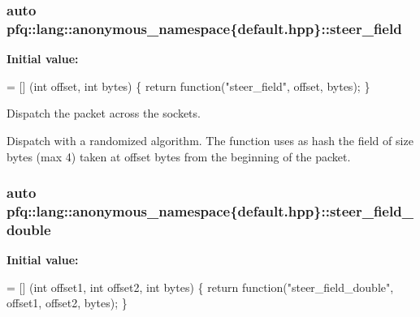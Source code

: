 \subsubsection[{\texorpdfstring{steer\+\_\+field}{steer_field}}]{\setlength{\rightskip}{0pt plus 5cm}auto pfq\+::lang\+::anonymous\+\_\+namespace\{default.\+hpp\}\+::steer\+\_\+field}\hypertarget{namespacepfq_1_1lang_1_1anonymous__namespace_02default_8hpp_03_ad861e297a10876e534c5c9053ec23999}{}\label{namespacepfq_1_1lang_1_1anonymous__namespace_02default_8hpp_03_ad861e297a10876e534c5c9053ec23999}
{\bfseries Initial value\+:}
\begin{DoxyCode}
= [] (\textcolor{keywordtype}{int} offset, \textcolor{keywordtype}{int} bytes) \{
                                \textcolor{keywordflow}{return} \textcolor{keyword}{function}(\textcolor{stringliteral}{"steer\_field"}, offset, bytes);
                           \}
\end{DoxyCode}


Dispatch the packet across the sockets. 

Dispatch with a randomized algorithm. The function uses as {\ttfamily hash} the field of {\ttfamily size} bytes (max 4) taken at {\ttfamily offset} bytes from the beginning of the packet. 
\subsubsection[{\texorpdfstring{steer\+\_\+field\+\_\+double}{steer_field_double}}]{\setlength{\rightskip}{0pt plus 5cm}auto pfq\+::lang\+::anonymous\+\_\+namespace\{default.\+hpp\}\+::steer\+\_\+field\+\_\+double}\hypertarget{namespacepfq_1_1lang_1_1anonymous__namespace_02default_8hpp_03_aabbf7feb753f3c5b1b40cfa8a54581e5}{}\label{namespacepfq_1_1lang_1_1anonymous__namespace_02default_8hpp_03_aabbf7feb753f3c5b1b40cfa8a54581e5}
{\bfseries Initial value\+:}
\begin{DoxyCode}
= [] (\textcolor{keywordtype}{int} offset1, \textcolor{keywordtype}{int} offset2, \textcolor{keywordtype}{int} bytes) \{
                                \textcolor{keywordflow}{return} \textcolor{keyword}{function}(\textcolor{stringliteral}{"steer\_field\_double"}, offset1, offset2, bytes);
                           \}
\end{DoxyCode}


